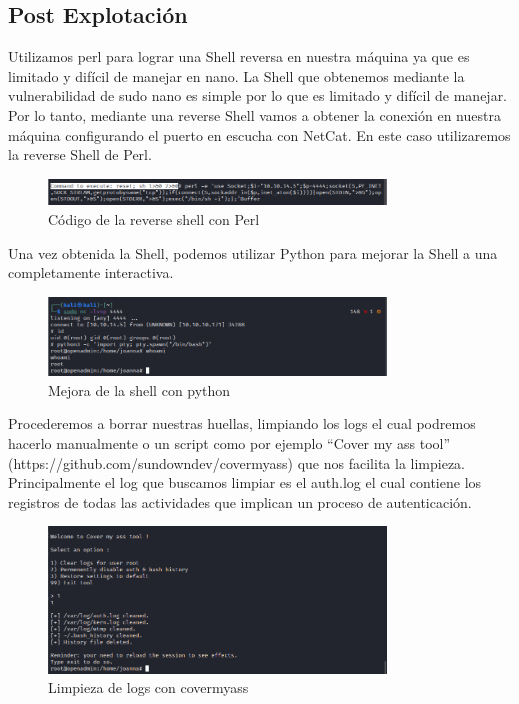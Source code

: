 \documentclass{article}
\begin{document}
\subsection{Post Explotación}

Utilizamos perl para lograr una Shell reversa en nuestra máquina ya que es limitado y difícil de manejar en nano.
La Shell que obtenemos mediante la vulnerabilidad de sudo nano es simple por lo que es limitado y difícil de manejar. Por lo tanto, mediante una reverse Shell vamos a obtener la conexión en nuestra máquina configurando el puerto en escucha con NetCat. En este caso utilizaremos la reverse Shell de Perl.
\begin{figure}[h]
	\center
	\includegraphics[width=0.8\textwidth]{images/openadmin/21-reverseshellperl.png}
	\caption{Código de la reverse shell con Perl}
\end{figure}

Una vez obtenida la Shell, podemos utilizar Python para mejorar la Shell a una completamente interactiva.
\begin{figure}[h]
	\center
	\includegraphics[width=0.8\textwidth]{images/openadmin/22-conexionreverse}
	\caption{Mejora de la shell con python}
\end{figure}

Procederemos a borrar nuestras huellas, limpiando los logs el cual podremos hacerlo manualmente o un script como por ejemplo “Cover my ass tool” (https://github.com/sundowndev/covermyass) que nos facilita la limpieza. Principalmente el log que buscamos limpiar es el auth.log el cual contiene los registros de todas las actividades que implican un proceso de autenticación.
\begin{figure}[h]
	\center
	\includegraphics[width=0.8\textwidth]{images/openadmin/23-covermyass}
	\caption{Limpieza de logs con covermyass}
\end{figure}
\end{document}
